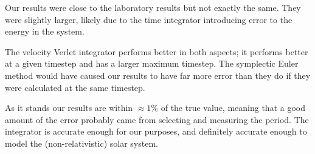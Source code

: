 \documentclass[12pt]{article}
\begin{document}
Our results were close to the laboratory results but not exactly the same. They were slightly larger, likely due to the time integrator introducing error to the energy in the system. 

The velocity Verlet integrator performs better in both aspects; it performs better at a given timestep and has a larger maximum timestep. The symplectic Euler method would have caused our results to have far more error than they do if they were calculated at the same timestep. 

As it stands our results are within $\approx 1\%$ of the true value, meaning that a good amount of the error probably came from selecting and measuring the period. The integrator is accurate enough for our purposes, and definitely accurate enough to model the (non-relativistic) solar system. 
\end{document}
